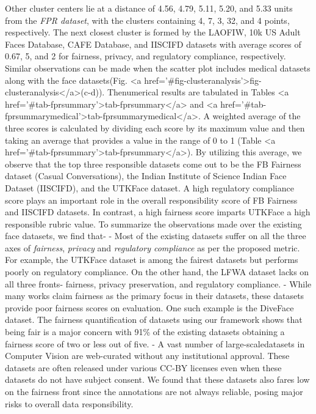 \documentclass[journal]{IEEEtran}
\begin{document}
Other cluster centers lie at a distance of 4.56, 4.79, 5.11, 5.20, and 5.33 units from the \textit{FPR dataset}, with the clusters containing 4, 7, 3, 32, and 4 points, respectively. The next closest cluster is formed by the LAOFIW, 10k US Adult Faces Database, CAFE Database, and IISCIFD datasets with average scores of 0.67, 5, and 2 for fairness, privacy, and regulatory compliance, respectively. Similar observations can be made when the scatter plot includes medical datasets along with the face datasets(Fig. <a href='#fig-clusteranalysis'>fig-clusteranalysis</a>(c-d)). Thenumerical results are tabulated in Tables <a href='#tab-fprsummary'>tab-fprsummary</a> and <a href='#tab-fprsummarymedical'>tab-fprsummarymedical</a>. A weighted average of the three scores is calculated by dividing each score by its maximum value and then taking an average that provides a value in the range of 0 to 1 (Table <a href='#tab-fprsummary'>tab-fprsummary</a>). By utilizing this average, we observe that the top three responsible datasets come out to be the FB Fairness dataset (Casual Conversations), the Indian Institute of Science Indian Face Dataset (IISCIFD), and the UTKFace dataset. A high regulatory compliance score plays an important role in the overall responsibility score of FB Fairness and IISCIFD datasets. In contrast, a high fairness score imparts UTKFace a high responsible rubric value. To summarize the observations made over the existing face datasets, we find that-
-  Most of the existing datasets suffer on all the three axes of \textit{fairness}, \textit{privacy} and \textit{regulatory compliance} as per the proposed metric. For example, the UTKFace dataset is among the fairest datasets but performs poorly on regulatory compliance. On the other hand, the LFWA dataset lacks on all three fronts- fairness, privacy preservation, and regulatory compliance.
-  While many works claim fairness as the primary focus in their datasets, these datasets provide poor fairness scores on evaluation. One such example is the DiveFace dataset. The fairness quantification of datasets using our framework shows that being fair is a major concern with 91\% of the existing datasets obtaining a fairness score of two or less out of five.
-  A vast number of large-scaledatasets in Computer Vision are web-curated without any institutional approval. These datasets are often released under various CC-BY licenses even when these datasets do not have subject consent. We found that these datasets also fares low on the fairness front since the annotations are not always reliable, posing major risks to overall data responsibility.
\end{document}
